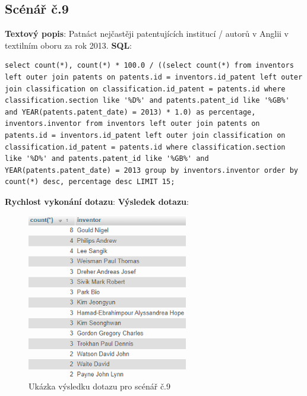\subsection{Scénář č.9}
\textbf{Textový popis}: Patnáct nejčastěji patentujících institucí / autorů v Anglii v textilním oboru za rok 2013.
\newline
\textbf{SQL}: 
\begin{lstlisting}[label = {lst:elements_a}]
select count(*), count(*) * 100.0 / ((select count(*) from inventors left outer join patents on patents.id = inventors.id_patent left outer join classification on classification.id_patent = patents.id where classification.section like '%D%' and patents.patent_id like '%GB%' and YEAR(patents.patent_date) = 2013) * 1.0) as percentage, inventors.inventor from inventors left outer join patents on patents.id = inventors.id_patent left outer join classification on classification.id_patent = patents.id where classification.section like '%D%' and patents.patent_id like '%GB%' and YEAR(patents.patent_date) = 2013 group by inventors.inventor order by count(*) desc, percentage desc LIMIT 15;
\end{lstlisting}
\textbf{Rychlost vykonání dotazu}: 
\newline
\textbf{Výsledek dotazu}:
\begin{figure}[H]
\centering
\includegraphics[width=7cm]{img/scenare/scenar_9}
\caption{Ukázka výsledku dotazu pro scénář č.9}
\label{fig:scenar9}
\end{figure}